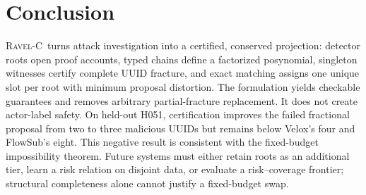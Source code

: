 \documentclass[runningheads]{llncs}
\newcommand{\ravelc}{\textsc{Ravel-C}}
\begin{document}
\section{Conclusion}

\ravelc\ turns attack investigation into a certified, conserved projection: detector roots open proof accounts, typed chains define a factorized posynomial, singleton witnesses certify complete UUID fracture, and exact matching assigns one unique slot per root with minimum proposal distortion. The formulation yields checkable guarantees and removes arbitrary partial-fracture replacement. It does not create actor-label safety. On held-out H051, certification improves the failed fractional proposal from two to three malicious UUIDs but remains below Velox's four and FlowSub's eight. This negative result is consistent with the fixed-budget impossibility theorem. Future systems must either retain roots as an additional tier, learn a risk relation on disjoint data, or evaluate a risk--coverage frontier; structural completeness alone cannot justify a fixed-budget swap.



\end{document}
